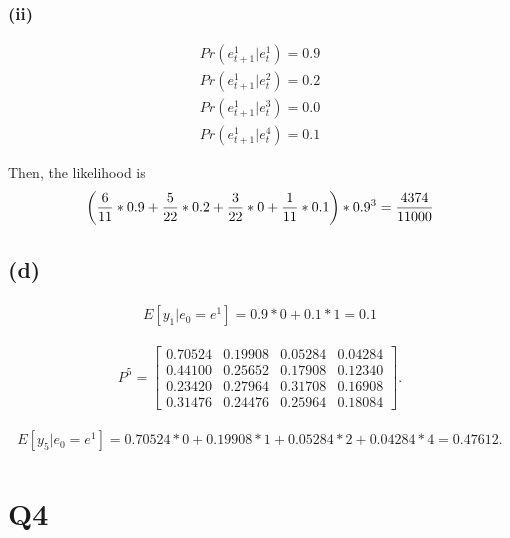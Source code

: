 \documentclass{ltjsarticle}
\begin{document}
\subsubsection*{(ii)}

\begin{align*}
    Pr(e^1_{t+1}|e^1_{t})=0.9\\
    Pr(e^1_{t+1}|e^2_{t})=0.2\\
    Pr(e^1_{t+1}|e^3_{t})=0.0\\
    Pr(e^1_{t+1}|e^4_{t})=0.1
\end{align*}


Then, the likelihood is 
\begin{align*}
    \qty(\frac{6}{11}*0.9+\frac{5}{22}*0.2+\frac{3}{22}*0+\frac{1}{11}*0.1)*0.9^3=\frac{4374}{11000}
\end{align*}



\subsection*{(d)}

\begin{align*}
    E[y_1|e_0=e^1] = 0.9*0 + 0.1*1 = 0.1
\end{align*}


\begin{align*}
    P^5 = \begin{bmatrix}
        0.70524 & 0.19908 & 0.05284 & 0.04284 \\
        0.44100 & 0.25652 & 0.17908 & 0.12340 \\
        0.23420 & 0.27964 & 0.31708 & 0.16908 \\
        0.31476 & 0.24476 & 0.25964 & 0.18084
        \end{bmatrix}.
\end{align*}

\begin{align*}
    E[y_5|e_0=e^1] = 0.70524*0 + 0.19908*1 + 0.05284*2 + 0.04284*4 = 0.47612.
\end{align*}

\section*{Q4}
\end{document}

